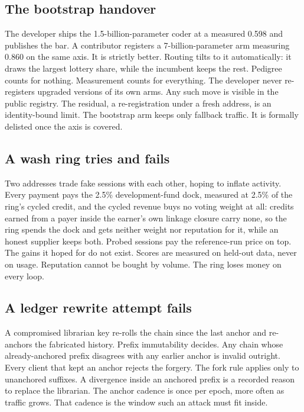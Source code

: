 \documentclass[11pt]{article}
\begin{document}
\subsection{The bootstrap handover}

The developer ships the 1.5-billion-parameter coder at a measured
0.598 and publishes the bar. A contributor registers a
7-billion-parameter arm measuring 0.860 on the same axis. It is
strictly better. Routing tilts to it automatically: it draws the
largest lottery share, while the incumbent keeps the rest.
Pedigree counts for nothing. Measurement counts for everything. The
developer never re-registers upgraded versions of its own arms.
Any such move is visible in the public registry. The residual, a
re-registration under a fresh address, is an identity-bound
limit. The bootstrap arm keeps only
fallback traffic. It is formally delisted once the axis is
covered.

\subsection{A wash ring tries and fails}

Two addresses trade fake sessions with each other, hoping to
inflate activity. Every payment pays the 2.5\% development-fund
dock, measured at 2.5\% of the ring's cycled credit, and
the cycled revenue buys no voting weight at all: credits earned
from a payer inside the earner's own linkage closure carry none,
so the ring spends the dock and gets neither weight nor
reputation for it, while an honest supplier keeps both. Probed
sessions pay the reference-run price on top. The gains it
hoped for do not exist. Scores are measured on held-out data,
never on usage. Reputation cannot be bought by volume. The ring
loses money on every loop.

\subsection{A ledger rewrite attempt fails}

A compromised librarian key re-rolls the chain since the last
anchor and re-anchors the fabricated history. Prefix immutability
decides. Any chain whose already-anchored prefix disagrees with
any earlier anchor is invalid outright. Every client that kept an
anchor rejects the forgery. The fork rule applies only to
unanchored suffixes. A divergence inside an anchored prefix is a
recorded reason to replace the librarian. The anchor cadence is
once per epoch, more often as traffic grows. That cadence is the
window such an attack must fit inside.
\end{document}
